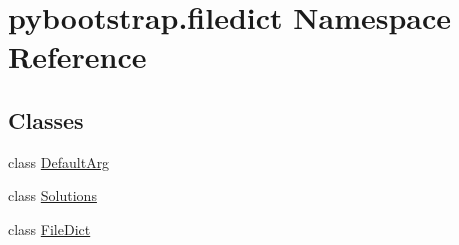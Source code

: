 \hypertarget{namespacepybootstrap_1_1filedict}{\section{pybootstrap.\-filedict Namespace Reference}
\label{namespacepybootstrap_1_1filedict}
}
\subsection*{Classes}
\begin{DoxyCompactItemize}
\item 
class \hyperlink{classpybootstrap_1_1filedict_1_1DefaultArg}{Default\-Arg}
\item 
class \hyperlink{classpybootstrap_1_1filedict_1_1Solutions}{Solutions}
\item 
class \hyperlink{classpybootstrap_1_1filedict_1_1FileDict}{File\-Dict}
\end{DoxyCompactItemize}
